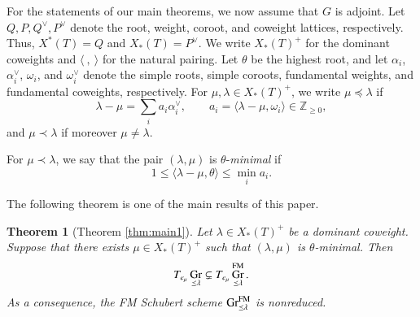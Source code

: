 \documentclass[a4paper, 12pt]{amsart}
\newtheorem{introtheorem}[introconjecture]{Theorem}
\theoremstyle{definition}
\DeclareMathOperator{\Gr}{\mathrm{Gr}}
\begin{document}
\vspace{1mm}
For the statements of our main theorems, we now assume that $G$ is adjoint.
Let $Q,P,Q^\vee,P^\vee$ denote the root, weight, coroot, and coweight
lattices, respectively. Thus, $X^*(T)=Q$ and $X_*(T)=P^\vee$.
We write $X_*(T)^+$ for the dominant coweights and
$\langle\ ,\ \rangle$ for the natural pairing. Let $\theta$ be the
highest root, and let $\alpha_i$, $\alpha_i^\vee$, $\omega_i$, and
$\omega_i^\vee$ denote the simple roots, simple coroots, fundamental
weights, and fundamental coweights, respectively. For
$\mu,\lambda\in X_*(T)^+$, we write $\mu\preceq\lambda$ if
\[
\lambda-\mu=\sum_i a_i\alpha_i^\vee,
\qquad a_i=\langle\lambda-\mu,\omega_i\rangle\in\mathbb Z_{\geq0},
\]
and $\mu\prec\lambda$ if moreover $\mu\neq\lambda$.

For $\mu\prec\lambda$, we say that the pair $(\lambda,\mu)$ is $\theta$-\emph{minimal} if
\begin{equation}\label{eq:intro-admissible}
1\leq\langle\lambda-\mu,\theta\rangle
\leq\min_i a_i.
\end{equation}

The following theorem is one of the main results of this paper. 
\begin{introtheorem}[Theorem \ref{thm:main1}]\label{thm:intro-main}
Let $\lambda\in X_*(T)^+$ be a dominant coweight. Suppose that there exists
$\mu\in X_*(T)^+$ such that $(\lambda,\mu)$ is $\theta$-minimal.  Then
\[
 T_{e_\mu}\Gr_{\preceq\lambda}
 \subsetneq
 T_{e_\mu}\Gr^{\rm FM}_{\preceq\lambda}.
\]
As a consequence, the FM Schubert scheme $\Gr^{\rm FM}_{\preceq\lambda}$ is nonreduced.
\end{introtheorem}
\end{document}
